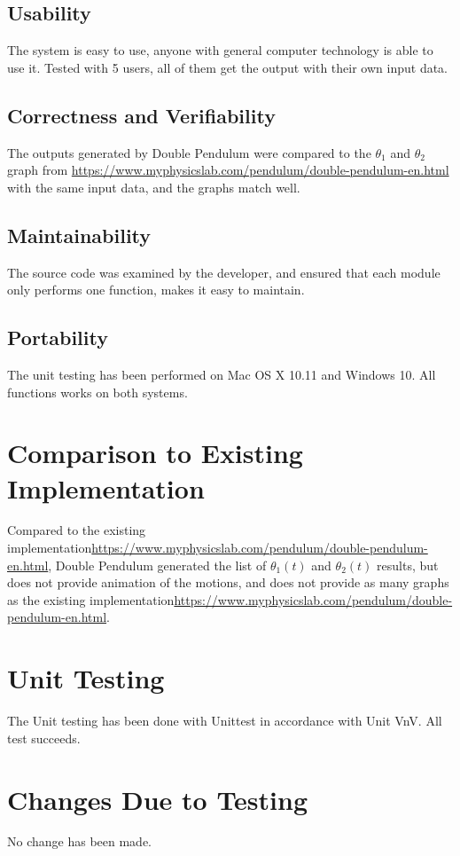 \documentclass[12pt, titlepage]{article}
\begin{document}
\subsection{Usability}
The system is easy to use, anyone with general computer technology is able to use it. Tested with 5 users, all of them get the output with their own input data. 

\subsection{Correctness and Verifiability}
The outputs generated by Double Pendulum were compared to the $\theta_1$ and $\theta_2$ graph from \url{https://www.myphysicslab.com/pendulum/double-pendulum-en.html} with the same input data, and the graphs match well. 

\subsection{Maintainability}
The source code was examined by the developer, and ensured that each module only performs one function, makes it easy to maintain.  


\subsection{Portability}
The unit testing has been performed on Mac OS X 10.11 and Windows 10. All functions works on both systems.
  
\section{Comparison to Existing Implementation} 
Compared to the existing implementation\url{https://www.myphysicslab.com/pendulum/double-pendulum-en.html}, Double Pendulum generated the list of $\theta_1(t)$ and $\theta_2(t)$ results, but does not provide animation of the motions, and does not provide as many graphs as the existing implementation\url{https://www.myphysicslab.com/pendulum/double-pendulum-en.html}. 

\section{Unit Testing}
The Unit testing has been done with Unittest in accordance with Unit VnV. All test succeeds. 

\section{Changes Due to Testing}
No change has been made. 
\end{document}
